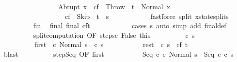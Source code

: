 \begin{isabellebody}
\ \ \ \ \ \ \ \ \ \ \ \ \ \ \ \ \ Abrupt\ x\ {\isasymRightarrow}\ c\isactrlsub f\ {\isacharequal}\ Throw\ {\isasymand}\ t\ {\isacharequal}\ Normal\ x\isanewline
\ \ \ \ \ \ \ \ \ \ \ \ \ \ \ \ {\isacharbar}\ {\isacharunderscore}\ {\isasymRightarrow}\ c\isactrlsub f\ {\isacharequal}\ Skip\ {\isasymand}\ t\ {\isacharequal}\ s{\isacharprime}{\isacharparenright}{\isachardoublequoteclose}\isanewline
\ \ \ \ \ \ \ \ \ \ \isamarkupfalse%
\ {\isacharparenleft}fastforce\ split{\isacharcolon}\ xstate{\isachardot}splits{\isacharparenright}\isanewline
\ \ \ \ \ \ \ \ \isamarkupfalse%
\ fin\ \isamarkupfalse%
\ final{\isacharcolon}\ {\isachardoublequoteopen}final\ {\isacharparenleft}c\isactrlsub f{\isacharcomma}t{\isacharparenright}{\isachardoublequoteclose}\isanewline
\ \ \ \ \ \ \ \ \ \ \isamarkupfalse%
\ {\isacharparenleft}cases\ s{\isacharprime}{\isacharparenright}\ {\isacharparenleft}auto\ simp\ add{\isacharcolon}\ final{\isacharunderscore}def{\isacharparenright}\isanewline
\ \ \ \ \ \ \ \ \isamarkupfalse%
\ split{\isacharunderscore}computation\ {\isacharbrackleft}OF\ steps{\isacharunderscore}c\ False\ this{\isacharbrackright}\isanewline
\ \ \ \ \ \ \ \ \isamarkupfalse%
\ c{\isacharprime}{\isacharprime}\ s{\isacharprime}{\isacharprime}\ \isanewline
\ \ \ \ \ \ \ \ \ \ first{\isacharcolon}\ {\isachardoublequoteopen}{\isasymGamma}{\isasymturnstile}\ {\isacharparenleft}c\ Normal\ s{\isacharparenright}\ {\isasymrightarrow}\ {\isacharparenleft}c{\isacharprime}{\isacharprime}{\isacharcomma}\ s{\isacharprime}{\isacharprime}{\isacharparenright}{\isachardoublequoteclose}\ \isanewline
\ \ \ \ \ \ \ \ \ \ rest{\isacharcolon}\ {\isachardoublequoteopen}{\isasymGamma}{\isasymturnstile}\ {\isacharparenleft}c{\isacharprime}{\isacharprime}{\isacharcomma}\ s{\isacharprime}{\isacharprime}{\isacharparenright}\ {\isasymrightarrow}\isactrlsup {\isacharasterisk}\ {\isacharparenleft}c\isactrlsub f{\isacharcomma}\ t{\isacharparenright}{\isachardoublequoteclose}\ \isanewline
\ \ \ \ \ \ \ \ \ \ \isamarkupfalse%
\ blast\isanewline
\ \ \ \ \ \ \ \ \isamarkupfalse%
\ step{\isachardot}Seq\ {\isacharbrackleft}OF\ first{\isacharbrackright}\isanewline
\ \ \ \ \ \ \ \ \isamarkupfalse%
\ {\isachardoublequoteopen}{\isasymGamma}{\isasymturnstile}\ {\isacharparenleft}Seq\ c\ c\ Normal\ s{\isacharparenright}\ {\isasymrightarrow}\ {\isacharparenleft}Seq\ c{\isacharprime}{\isacharprime}\ c\ s{\isacharprime}{\isacharprime}{\isacharparenright}{\isachardoublequoteclose}\isacommand{{\isachardot}}\isamarkupfalse%

\end{isabellebody}
